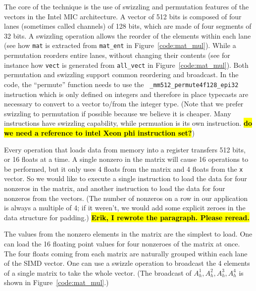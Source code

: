 \documentclass[10pt,conference,compsocconf]{IEEEtran}
\newcommand{\todo}[1]{{\color{red}\textbf{\hl{#1}}\xspace}}
\begin{document}
The core of the technique is the use of swizzling and permutation
features of the vectors in the Intel MIC architecture. A vector of 512
bits is composed of four lanes (sometimes called channels) of 128
bits, which are made of four segments of 32 bits. A swizzling
operation allows the reorder of the elements within each lane (see how
{\tt mat} is extracted from {\tt mat\_ent} in
Figure~\ref{code:mat_mul}). While a permutation reorders entire lanes,
without changing their contents (see for instance how {\tt vect} is
generated from {\tt all\_vect} in Figure~\ref{code:mat_mul}).  Both
permutation and swizzling support common reordering and broadcast. In
the code, the ``permute'' function needs to use the {\tt
  \_mm512\_permute4f128\_epi32} instruction which is only defined on
integers and therefore in place typecasts are necessary to convert to
a vector to/from the integer type.  (Note that we prefer swizzling to
permutation if possible because we believe it is cheaper. Many
instructions have swizzling capability, while permuation is its own
instruction. \todo{do we need a reference to intel Xeon phi instruction set?})

Every operation that loads data from memory into a register
transfers 512 bits, or 16 floats at a time. A single nonzero
in the matrix will cause 16 operations to be performed, but it only
uses 4 floats from the matrix and 4 floats from the {\tt x} vector. So
we would like to execute a single instruction to load the data for four 
nonzeros in the matrix, and another instruction to load the data for
four nonzeros from the vectors.  
(The number of nonzeros on a row in our application is
always a multiple of 4; if it weren't, we would add some explicit
zeroes in the data structure for padding.)
\todo{Erik, I rewrote the paragraph. Please reread.}

The values from the nonzero elements in the matrix are the simplest to
load. One can load the 16 floating point values for four nonzeroes of
the matrix at once. The four floats coming from each matrix are
naturally grouped within each lane of the SIMD vector. One can use a
swizzle operation to broadcast the 4 elements of a single matrix to
take the whole vector. (The broadcast of $A_h^1,A_h^2,A_h^3,A_h^4$ is
shown in Figure~\ref{code:mat_mul}.)
\end{document}
